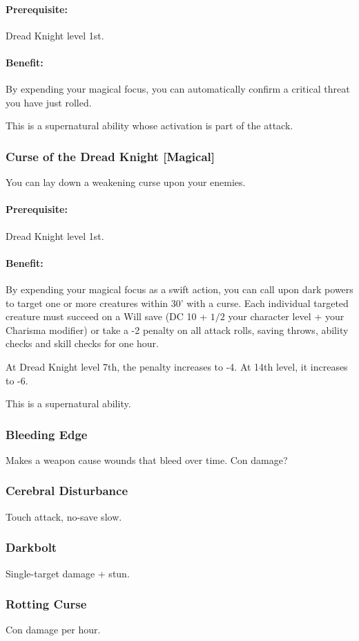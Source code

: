 \paragraph{Prerequisite:} Dread Knight level 1st.

\paragraph{Benefit:}
By expending your magical focus, you can automatically confirm a critical threat you have just rolled.

This is a supernatural ability whose activation is part of the attack.
\subsubsection[Curse of the Dread Knight]{Curse of the Dread Knight [Magical]}
\label{Feat:CurseOfTheDreadKnight}
You can lay down a weakening curse upon your enemies.

\paragraph{Prerequisite:} Dread Knight level 1st.

\paragraph{Benefit:}
By expending your magical focus as a swift action, 
you can call upon dark powers to target one or more creatures within 30' with a curse.
Each individual targeted creature must succeed on a Will save (DC 10 + $1/2$ your character level + your Charisma modifier) 
or take a -2 penalty on all attack rolls, saving throws, ability checks and skill checks for one hour.

At Dread Knight level 7th, the penalty increases to -4. At 14th level, it increases to -6.

This is a supernatural ability.
\subsubsection{Bleeding Edge}
Makes a weapon cause wounds that bleed over time. Con damage?
\subsubsection{Cerebral Disturbance}
Touch attack, no-save slow.
\subsubsection{Darkbolt}
Single-target damage + stun.
\subsubsection{Rotting Curse}
Con damage per hour.